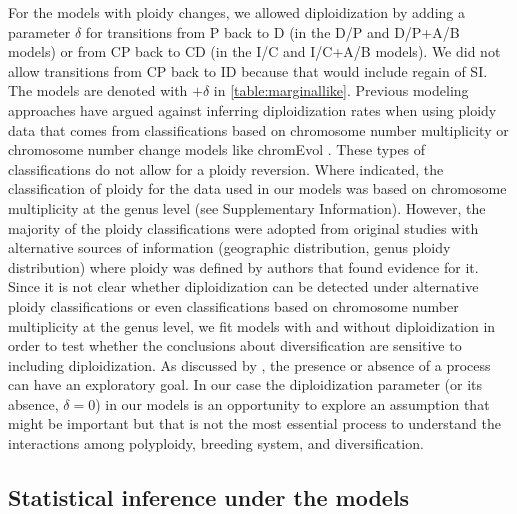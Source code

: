 For the models with ploidy changes, we allowed diploidization by adding a parameter $\delta$ for transitions from P back to D (in the D/P and D/P+A/B models) or from CP back to CD (in the I/C and I/C+A/B models).
We did not allow transitions from CP back to ID because that would include regain of SI.
The models are denoted with $+\delta$ in \cref{table:marginallike}.
Previous modeling approaches \citep{mayrose_2011} have argued against inferring diploidization rates when using ploidy data that comes from classifications based on chromosome number multiplicity or chromosome number change models like chromEvol \citep{mayrose_2010, glick2014, mayrose_2015, freyman_2017}.
These types of classifications do not allow for a ploidy reversion.
Where indicated, the classification of ploidy for the data used in our models was based on chromosome multiplicity at the genus level (see Supplementary Information). %
However, the majority of the ploidy classifications were adopted from original studies with alternative sources of information (\eg geographic distribution, genus ploidy distribution) where ploidy was defined by authors that found evidence for it.
Since it is not clear whether diploidization can be detected under alternative ploidy classifications or even classifications based on chromosome number multiplicity at the genus level, we fit models with and without diploidization in order to test  whether the conclusions about diversification are sensitive to including diploidization.
As discussed by \citet{servedio_2014}, the presence or absence of a process can have an exploratory goal.
In our case the diploidization parameter (or its absence, $\delta=0$) in our models is an opportunity to explore an assumption that might be important but that is not the most essential process to understand the interactions among polyploidy, breeding system, and diversification.

\subsection{Statistical inference under the models}

